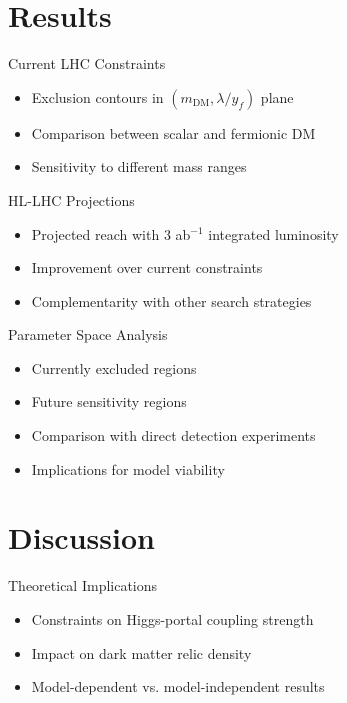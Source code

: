 \documentclass{../../bredelebeamer}
\begin{document}
\section{Results}
\begin{frame}{Current LHC Constraints}
    \begin{itemize}
        \item Exclusion contours in $(m_{\text{DM}}, \lambda/y_f)$ plane
        \item Comparison between scalar and fermionic DM
        \item Sensitivity to different mass ranges
    \end{itemize}
\end{frame}

\begin{frame}{HL-LHC Projections}
    \begin{itemize}
        \item Projected reach with 3 ab$^{-1}$ integrated luminosity
        \item Improvement over current constraints
        \item Complementarity with other search strategies
    \end{itemize}
\end{frame}

\begin{frame}{Parameter Space Analysis}
    \begin{itemize}
        \item Currently excluded regions
        \item Future sensitivity regions
        \item Comparison with direct detection experiments
        \item Implications for model viability
    \end{itemize}
\end{frame}

\section{Discussion}
\begin{frame}{Theoretical Implications}
    \begin{itemize}
        \item Constraints on Higgs-portal coupling strength
        \item Impact on dark matter relic density
        \item Model-dependent vs. model-independent results
    \end{itemize}
\end{frame}
\end{document}
